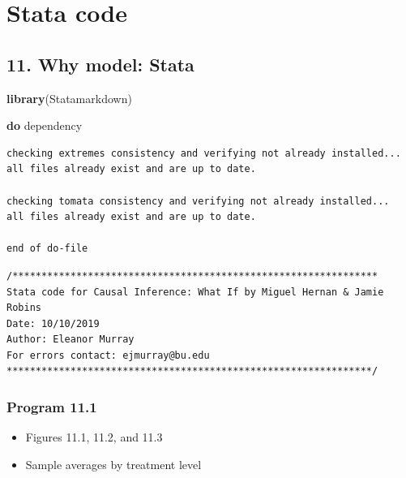 \documentclass[
  10pt,
]{book}
\newenvironment{Shaded}{\begin{snugshade}}{\end{snugshade}}
\newcommand{\KeywordTok}[1]{\textcolor[rgb]{0.13,0.29,0.53}{\textbf{#1}}}
\newcommand{\NormalTok}[1]{#1}
\providecommand{\tightlist}{%
  \setlength{\itemsep}{0pt}\setlength{\parskip}{0pt}}
\begin{document}
\hypertarget{part-stata-code}{%
\part*{Stata code}\label{part-stata-code}}

\hypertarget{why-model-stata}{%
\chapter*{11. Why model: Stata}\label{why-model-stata}}

\begin{Shaded}
\begin{Highlighting}[]
\KeywordTok{library}\NormalTok{(Statamarkdown)}
\end{Highlighting}
\end{Shaded}

\begin{Shaded}
\begin{Highlighting}[]
\KeywordTok{do}\NormalTok{ dependency}
\end{Highlighting}
\end{Shaded}

\begin{verbatim}
checking extremes consistency and verifying not already installed...
all files already exist and are up to date.

checking tomata consistency and verifying not already installed...
all files already exist and are up to date.

end of do-file
\end{verbatim}

\begin{verbatim}
/***************************************************************
Stata code for Causal Inference: What If by Miguel Hernan & Jamie Robins
Date: 10/10/2019
Author: Eleanor Murray 
For errors contact: ejmurray@bu.edu
***************************************************************/
\end{verbatim}

\hypertarget{program-11.1-1}{%
\section{Program 11.1}\label{program-11.1-1}}

\begin{itemize}
\tightlist
\item
  Figures 11.1, 11.2, and 11.3
\item
  Sample averages by treatment level
\end{itemize}
\end{document}
